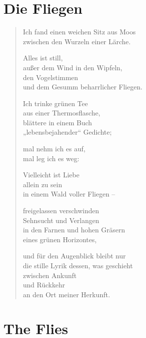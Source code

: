 
\section{Die Fliegen}

\begin{verse}
Ich fand einen weichen Sitz aus Moos\\
zwischen den Wurzeln einer Lärche.

Alles ist still,\\
außer dem Wind in den Wipfeln,\\
den Vogelstimmen\\
und dem Gesumm beharrlicher Fliegen.

Ich trinke grünen Tee\\
aus einer Thermosflasche,\\
blättere in einem Buch\\
„lebensbejahender“ Gedichte;

mal nehm ich es auf,\\
mal leg ich es weg:

Vielleicht ist Liebe\\
allein zu sein\\
in einem Wald voller Fliegen --

freigelassen verschwinden\\
Sehnsucht und Verlangen\\
in den Farnen und hohen Gräsern\\
eines grünen Horizontes,

und für den Augenblick bleibt nur\\
die stille Lyrik dessen, was geschieht\\
zwischen Ankunft\\
und Rückkehr\\
an den Ort meiner Herkunft.
\end{verse}

\section{The Flies}


